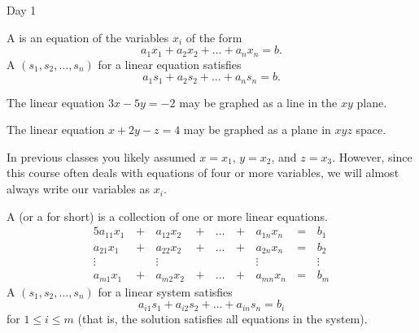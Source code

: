
\begin{applicationActivities}{Day 1}

\begin{definition}
A  is an equation of the variables \(x_i\) of the form
\[
a_1x_1+a_2x_2+\dots+a_nx_n=b
.\]
A  \((s_1,s_2,\dots,s_n)\) for a linear equation satisfies
\[
a_1s_1+a_2s_2+\dots+a_ns_n=b
.\]
\end{definition}

\begin{observation}
The linear equation \(3x-5y=-2\) may be graphed as a line in the \(xy\) plane.

\begin{center}
\end{center}

The linear equation \(x+2y-z=4\) may be graphed as a plane in \(xyz\) space.
\end{observation}

\begin{remark}
In previous classes you likely assumed \(x=x_1\), \(y=x_2\), and \(z=x_3\).
However, since this course often deals with equations of four or more
variables, we will almost always write our variables as \(x_i\).
\end{remark}

\begin{definition}
A  (or a  for short)
is a collection of one or more linear equations.
  \begin{alignat*}{5}
    a_{11}x_1 &\,+\,& a_{12}x_2 &\,+\,& \dots  &\,+\,& a_{1n}x_n &\,=\,& b_1 \\
    a_{21}x_1 &\,+\,& a_{22}x_2 &\,+\,& \dots  &\,+\,& a_{2n}x_n &\,=\,& b_2 \\
     \vdots&  &\vdots&   &&  &\vdots&&\vdots  \\
    a_{m1}x_1 &\,+\,& a_{m2}x_2 &\,+\,& \dots  &\,+\,& a_{mn}x_n &\,=\,& b_m
  \end{alignat*}
A  \((s_1,s_2,\dots,s_n)\) for a linear system satisfies
\[
a_{i1}s_1+a_{i2}s_2+\dots+a_{in}s_n=b_i
\]
for \(1\leq i\leq m\) (that is, the solution satisfies all equations
in the system).
\end{definition}


\end{applicationActivities}
